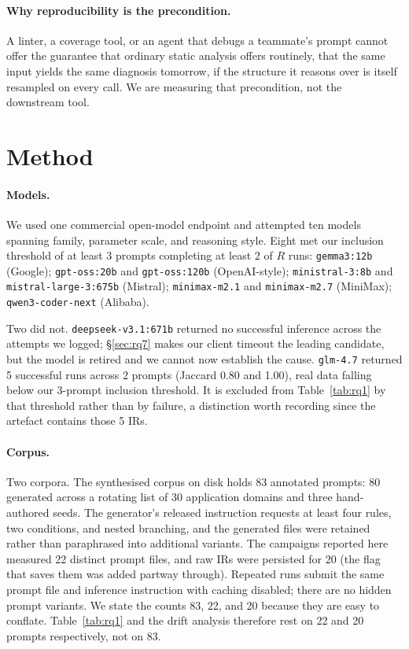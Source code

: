 \documentclass{article}
\begin{document}
\paragraph{Why reproducibility is the precondition.}
A linter, a coverage tool, or an agent that debugs a teammate's prompt cannot offer the guarantee that ordinary static analysis offers routinely, that the same input yields the same diagnosis tomorrow, if the structure it reasons over is itself resampled on every call. We are measuring that precondition, not the downstream tool.

\section{Method}
\label{sec:method}

\paragraph{Models.}
We used one commercial open-model endpoint and attempted ten models spanning family, parameter scale, and reasoning style. Eight met our inclusion threshold of at least 3 prompts completing at least 2 of $R$ runs: \texttt{gemma3:12b} (Google); \texttt{gpt-oss:20b} and \texttt{gpt-oss:120b} (OpenAI-style); \texttt{ministral-3:8b} and \texttt{mistral-large-3:675b} (Mistral); \texttt{minimax-m2.1} and \texttt{minimax-m2.7} (MiniMax); \texttt{qwen3-coder-next} (Alibaba).

Two did not. \texttt{deepseek-v3.1:671b} returned no successful inference across the attempts we logged; \S\ref{sec:rq7} makes our client timeout the leading candidate, but the model is retired and we cannot now establish the cause. \texttt{glm-4.7} returned 5 successful runs across 2 prompts (Jaccard 0.80 and 1.00), real data falling below our 3-prompt inclusion threshold. It is excluded from Table~\ref{tab:rq1} by that threshold rather than by failure, a distinction worth recording since the artefact contains those 5 IRs.

\paragraph{Corpus.}
Two corpora. The synthesised corpus on disk holds 83 annotated prompts: 80 generated across a rotating list of 30 application domains and three hand-authored seeds. The generator's released instruction requests at least four rules, two conditions, and nested branching, and the generated files were retained rather than paraphrased into additional variants. The campaigns reported here measured 22 distinct prompt files, and raw IRs were persisted for 20 (the flag that saves them was added partway through). Repeated runs submit the same prompt file and inference instruction with caching disabled; there are no hidden prompt variants. We state the counts 83, 22, and 20 because they are easy to conflate. Table~\ref{tab:rq1} and the drift analysis therefore rest on 22 and 20 prompts respectively, not on 83.
\end{document}
